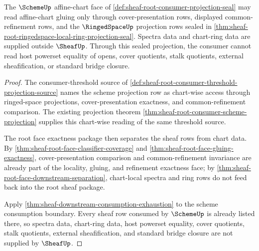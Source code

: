\begin{theorem}
\label{thm:sheaf-root-scheme-affine-chart-projection-seal}
The $\SchemeUp$ affine-chart face of \autoref{def:sheaf-root-consumer-projection-seal} may read affine-chart gluing only through cover-presentation rows, displayed common-refinement rows, and the $\RingedSpaceUp$ projection rows sealed in \autoref{thm:sheaf-root-ringedspace-local-ring-projection-seal}. Spectra data and chart-ring data are supplied outside $\SheafUp$. Through this sealed projection, the consumer cannot read host powerset equality of opens, cover quotients, stalk quotients, external sheafification, or standard bridge closure.
\end{theorem}
\begin{proof}
The consumer-threshold source of \autoref{def:sheaf-root-consumer-threshold-projection-source} names the scheme projection row as chart-wise access through ringed-space projections, cover-presentation exactness, and common-refinement comparison. The existing projection theorem \autoref{thm:sheaf-root-consumer-scheme-projection} supplies this chart-wise reading of the same threshold source.

The root face exactness package then separates the sheaf rows from chart data. By \autoref{thm:sheaf-root-face-classifier-coverage} and \autoref{thm:sheaf-root-face-gluing-exactness}, cover-presentation comparison and common-refinement invariance are already part of the locality, gluing, and refinement exactness face; by \autoref{thm:sheaf-root-face-downstream-separation}, chart-local spectra and ring rows do not feed back into the root sheaf package.

Apply \autoref{thm:sheaf-downstream-consumption-exhaustion} to the scheme consumption boundary. Every sheaf row consumed by $\SchemeUp$ is already listed there, so spectra data, chart-ring data, host powerset equality, cover quotients, stalk quotients, external sheafification, and standard bridge closure are not supplied by $\SheafUp$.
\end{proof}

